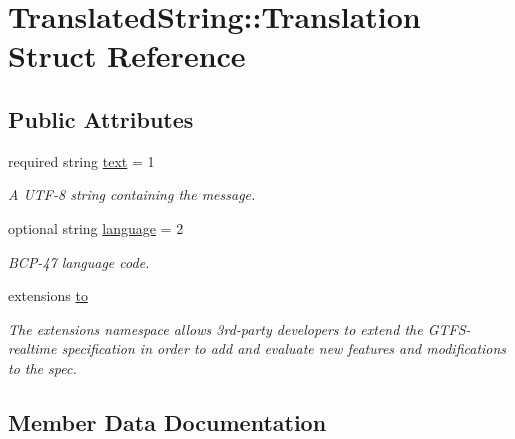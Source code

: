\hypertarget{structTranslatedString_1_1Translation}{}\section{Translated\+String\+:\+:Translation Struct Reference}
\label{structTranslatedString_1_1Translation}
\subsection*{Public Attributes}
\begin{DoxyCompactItemize}
\item 
required string \hyperlink{structTranslatedString_1_1Translation_ad8c9ddfdf079ac603cd433ca69252840}{text} = 1\hypertarget{structTranslatedString_1_1Translation_ad8c9ddfdf079ac603cd433ca69252840}{}\label{structTranslatedString_1_1Translation_ad8c9ddfdf079ac603cd433ca69252840}

\begin{DoxyCompactList}\small\item\em A U\+T\+F-\/8 string containing the message. \end{DoxyCompactList}\item 
optional string \hyperlink{structTranslatedString_1_1Translation_a6e5c700cec22dc98de803fb6b645a657}{language} = 2
\begin{DoxyCompactList}\small\item\em B\+C\+P-\/47 language code. \end{DoxyCompactList}\item 
extensions \hyperlink{structTranslatedString_1_1Translation_af612df22186e21e2472a5c6fcde687eb}{to}
\begin{DoxyCompactList}\small\item\em The extensions namespace allows 3rd-\/party developers to extend the G\+T\+F\+S-\/realtime specification in order to add and evaluate new features and modifications to the spec. \end{DoxyCompactList}\end{DoxyCompactItemize}


\subsection{Member Data Documentation}
